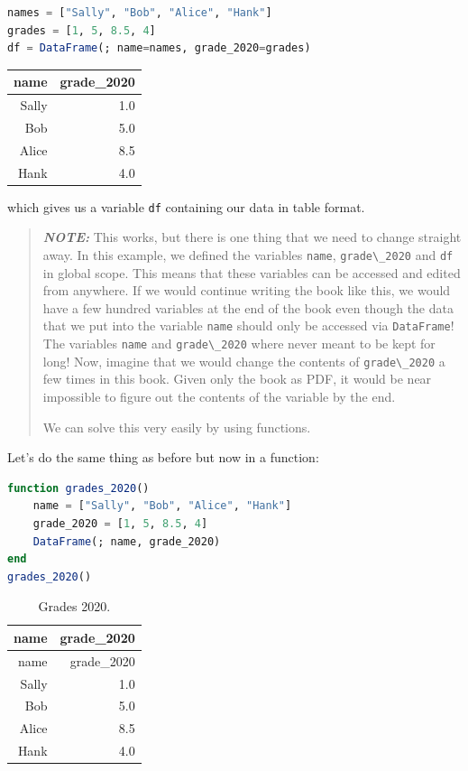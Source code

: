 \documentclass[
  notoc %
]{tufte-book}
\newcommand{\passthrough}[1]{#1}
\begin{document}
\begin{lstlisting}[language=Julia]
names = ["Sally", "Bob", "Alice", "Hank"]
grades = [1, 5, 8.5, 4]
df = DataFrame(; name=names, grade_2020=grades)
\end{lstlisting}

\begin{longtable}[]{@{}rr@{}}
\toprule
name & grade\_2020 \\
\midrule
\endhead
Sally & 1.0 \\
Bob & 5.0 \\
Alice & 8.5 \\
Hank & 4.0 \\
\bottomrule
\end{longtable}

which gives us a variable \passthrough{\lstinline!df!} containing our
data in table format.

\begin{quote}
\textbf{\emph{NOTE:}} This works, but there is one thing that we need to
change straight away. In this example, we defined the variables
\passthrough{\lstinline!name!}, \passthrough{\lstinline!grade\_2020!}
and \passthrough{\lstinline!df!} in global scope. This means that these
variables can be accessed and edited from anywhere. If we would continue
writing the book like this, we would have a few hundred variables at the
end of the book even though the data that we put into the variable
\passthrough{\lstinline!name!} should only be accessed via
\passthrough{\lstinline!DataFrame!}! The variables
\passthrough{\lstinline!name!} and \passthrough{\lstinline!grade\_2020!}
where never meant to be kept for long! Now, imagine that we would change
the contents of \passthrough{\lstinline!grade\_2020!} a few times in
this book. Given only the book as PDF, it would be near impossible to
figure out the contents of the variable by the end.

We can solve this very easily by using functions.
\end{quote}

Let's do the same thing as before but now in a function:

\begin{lstlisting}[language=Julia]
function grades_2020()
    name = ["Sally", "Bob", "Alice", "Hank"]
    grade_2020 = [1, 5, 8.5, 4]
    DataFrame(; name, grade_2020)
end
grades_2020()
\end{lstlisting}

\hypertarget{tbl:grades_2020}{}
\begin{longtable}[]{@{}rr@{}}
\caption{\label{tbl:grades_2020}Grades 2020.}\tabularnewline
\toprule
name & grade\_2020 \\
\midrule
\endfirsthead
\toprule
name & grade\_2020 \\
\midrule
\endhead
Sally & 1.0 \\
Bob & 5.0 \\
Alice & 8.5 \\
Hank & 4.0 \\
\bottomrule
\end{longtable}
\end{document}
